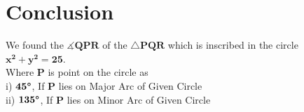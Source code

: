 \documentclass[journal,12pt,twocolumn]{article}
\let\vec\mathbf
\let\vec\mathbf
\begin{document}
\section{Conclusion}
\begin{center}
We found the  $\vec{\measuredangle{QPR}} $ of the $\vec{\triangle{PQR}}$ which is inscribed in the circle $\vec{x^2 + y^2 = 25}$.
\\Where $\vec{P}$ is  point on the circle as 
\\i) $\textbf{45\degree}$, If $\vec{P}$ lies on Major Arc of Given Circle\\
ii) $\textbf{135\degree}$, If $\vec{P}$ lies on Minor Arc of Given Circle
\end{center}
\end{document}
